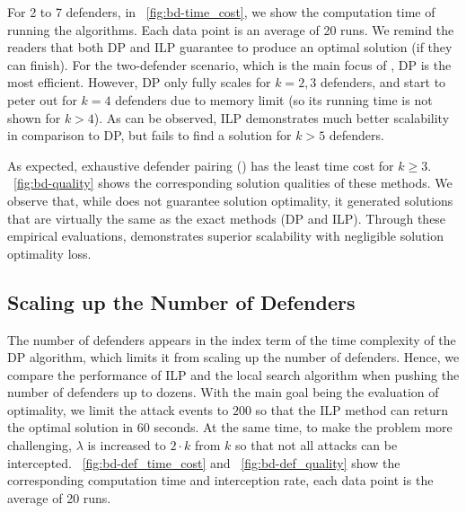 For 2 to 7 defenders, in ~\ref{fig:bd-time_cost}, we show the computation time of running the algorithms. 
Each data point is an average of 20 runs. 
We remind the readers that both DP and ILP guarantee to produce an optimal solution (if they can finish).
For the two-defender scenario, which is the main focus of \cite{adler2022role}, DP is the most efficient.
However, DP only fully scales for $k=2, 3$ defenders, and start to peter out for $k=4$ defenders due to memory limit (so its running time is not shown for $k>4$).
As can be observed, ILP demonstrates much better scalability in comparison to DP, but fails to find a solution for $k > 5$ defenders. 

As expected, exhaustive defender pairing (\ours) has the least time cost for $k \geq 3$.
~\ref{fig:bd-quality} shows the corresponding solution qualities of these methods. 
We observe that, while \ours does not guarantee solution optimality, it generated solutions that are virtually the same as the exact methods (DP and ILP). 
%
Through these empirical evaluations, \ours demonstrates superior scalability with negligible solution optimality loss. 



\subsection{Scaling up the Number of Defenders}
The number of defenders appears in the index term of the time complexity of the DP algorithm, which limits it from scaling up the number of defenders. Hence, we compare the performance of ILP and the local search algorithm when pushing the number of defenders up to dozens. With the main goal being the evaluation of optimality, we limit the attack events to $200$ so that the ILP method can return the optimal solution in $60$ seconds. At the same time, to make the problem more challenging, 
$\lambda$ is increased to $2\cdot k$ from $k$ so that not all attacks can be intercepted. 
~\ref{fig:bd-def_time_cost} and  ~\ref{fig:bd-def_quality} show the corresponding computation time 
and interception rate, each data point is the average of 20 runs.

